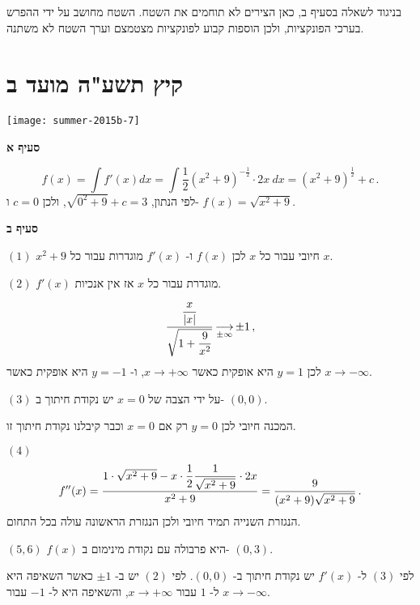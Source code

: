 בניגוד לשאלה בסעיף ב, כאן הצירים לא תוחמים את השטח. השטח מחושב על ידי ההפרש בערכי הפונקציות, ולכן הוספות קבוע לפונקציות מצטמצם וערך השטח לא משתנה.


\np


\section{קיץ תשע"ה מועד ב}

\begin{center}
\texttt{[image: summer-2015b-7]}
\end{center}

\vspace{-2ex}

\textbf{סעיף א}

\[
f(x)=\int f'(x) dx = \int \frac{1}{2}(x^2+9)^{-\frac{1}{2}}\cdot 2x\: dx = (x^2+9)^{\frac{1}{2}} +c\,.
\]
לפי הנתון,
$\sqrt{0^2+9}+c=3$,
ולכן
$c=0$
ו-%
$f(x) = \sqrt{x^2+9}$.

\textbf{סעיף ב}

$(1)$
$x^2+9$
חיובי עבור כל 
$x$
לכן
$f(x)$
ו-%
$f'(x)$
מוגדרות עבור כל
$x$.

$(2)$
$f'(x)$
מוגדרת עבור כל 
$x$
אז אין
\asms{}
אנכיות.

\[
\frac{\displaystyle\frac{x}{|x|}}{\sqrt{1+\displaystyle\frac{9}{x^2}}}\mathop{\longrightarrow}\limits_{\pm\infty}\pm 1\,,
\]
לכן 
$y=1$
היא 
\asm{}
אופקית כאשר
$x\rightarrow +\infty$,
ו-%
$y=-1$
היא
\asm{}
אופקית כאשר
$x\rightarrow -\infty$.


$(3)$
על ידי הצבה של
$x=0$
יש נקודת חיתוך ב-%
$(0,0)$.

המכנה חיובי לכן 
$y=0$
רק אם 
$x=0$
וכבר קיבלנו נקודת חיתוך זו.

\np

$(4)$
\[
f''(x)= \frac{1\cdot\sqrt{x^2+9}- x\cdot \displaystyle\frac{1}{2} \displaystyle\frac{1}{\sqrt{x^2+9}}\cdot 2x}{x^2+9}=\frac{9}{(x^2+9)\sqrt{x^2+9}}\,.
\]
הנגזרת השנייה תמיד חיובי ולכן הנגזרת הראשונה עולה בכל התחום.

$(5,6)$
$f(x)$
היא פרבולה עם נקודת מינימום ב-%
$(0,3)$.

לפי 
$(3)$
ל-%
$f'(x)$
יש נקודת חיתוך ב-%
$(0,0)$.
לפי 
$(2)$
יש 
\asms{}
ב-%
$\pm 1$
כאשר השאיפה היא ל-%
$1$
עבור 
$x\rightarrow +\infty$,
והשאיפה היא ל-%
$-1$
עבור 
$x\rightarrow -\infty$.

\begin{center}
\end{center}


